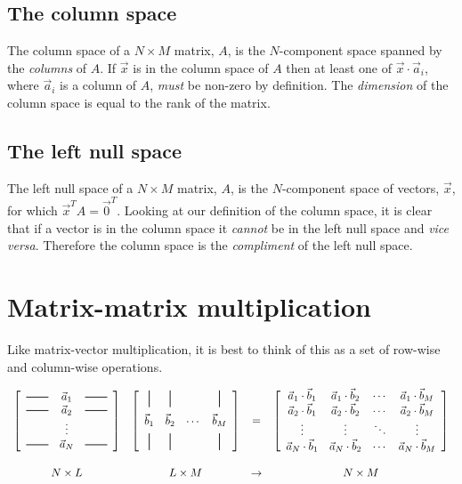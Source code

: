 \documentclass[a4paper]{article}
\newcommand{\hmatrixrule}{\rule[0.5ex]{2em}{0.7pt}}
\newcommand{\vmatrixrule}{\rule[-0.5ex]{0.7pt}{1.5em}}
\newcommand{\highlight}[1]{{\color{blue}#1}}
\begin{document}
\subsection{The column space}

The column space of a $N \times M$ matrix, $A$, is \highlight{the $N$-component
space spanned by the \emph{columns} of $A$}. If $\vec{x}$ is in the column
space of $A$ then at least one of $\vec{x} \cdot \vec{a}_i$, where $\vec{a}_i$
is a column of $A$, \emph{must} be non-zero by definition. \highlight{The
\emph{dimension} of the column space is equal to the rank of the matrix.}

\subsection{The left null space}

The left null space of a $N \times M$ matrix, $A$, is the \highlight{$N$-component}
space of vectors, $\vec{x}$, for which \highlight{$\vec{x}^TA = \vec{0}^T$}. Looking
at our definition of the column space, it is clear that if a vector is in the
column space it \emph{cannot} be in the left null space and \emph{vice versa}.
Therefore the column space is the \emph{compliment} of the left null space.

\section{Matrix-matrix multiplication}

Like matrix-vector multiplication, it is best to think of this as a set of
row-wise and column-wise operations.

\[
\begin{array}{cccc}
\left[
	\begin{array}{ccc}
		\hmatrixrule & \vec{a}_1 & \hmatrixrule \\
		\hmatrixrule & \vec{a}_2 & \hmatrixrule \\
		            & \vdots & \\
		\hmatrixrule & \vec{a}_N & \hmatrixrule
	\end{array}
\right] &
\left[
	\begin{array}{cccc}
		\vmatrixrule & \vmatrixrule &  & \vmatrixrule \\[1ex]
		\vec{b}_1 & \vec{b}_2 & \cdots & \vec{b}_M \\[1ex]
		\vmatrixrule & \vmatrixrule &  & \vmatrixrule 
	\end{array}
\right] &
= &
\left[
	\begin{array}{cccc}
\vec{a}_1 \cdot \vec{b}_1 & \vec{a}_1 \cdot \vec{b}_2 & \cdots & \vec{a}_1 \cdot \vec{b}_M \\
\vec{a}_2 \cdot \vec{b}_1 & \vec{a}_2 \cdot \vec{b}_2 & \cdots & \vec{a}_2 \cdot \vec{b}_M \\
\vdots & \vdots & \ddots & \vdots \\
\vec{a}_N \cdot \vec{b}_1 & \vec{a}_N \cdot \vec{b}_2 & \cdots & \vec{a}_N \cdot \vec{b}_M 
	\end{array}
\right]
\\
\rule{0pt}{2em} N \times L & L \times M & \rightarrow & N \times M
\end{array}
\]
\end{document}
